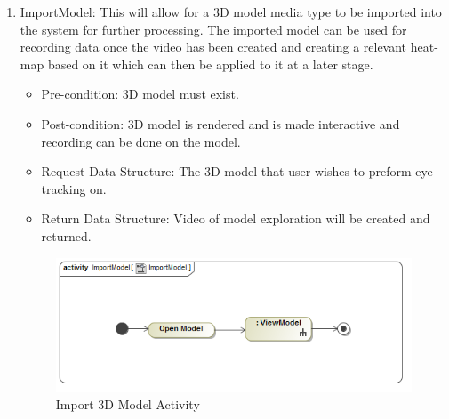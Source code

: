 	\begin{enumerate}
		\item{ImportModel:}
		\newline
		This will allow for a 3D model media type to be imported into the system for further processing. The imported model can be used for recording data once the video has been created and creating a relevant heat-map based on it which can then be applied to it at a later stage.
		\begin{itemize}
			\item Pre-condition: 3D model must exist.
			\item Post-condition: 3D model is rendered and is made interactive and recording can be done on the model.
			\item Request Data Structure: The 3D model that user wishes to preform eye tracking on.
			\item Return Data Structure: Video of model exploration will be created and returned.
		\end{itemize}
		
		\begin{figure}[!ht]
			\centering
			\includegraphics[scale=0.5,width=15cm,keepaspectratio]{Diagrams/Activity_Diagram__ImportModel__ImportModel.png}
			\caption{Import 3D Model Activity}
		\end{figure}
	

\end{enumerate}
